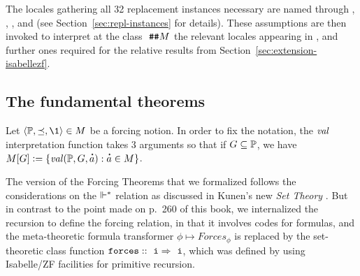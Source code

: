 The locales gathering all 32 replacement instances necessary are named
 through ,
,
, and
 (see
Section~\ref{sec:repl-instances} for details).
These assumptions are then invoked to interpret at the class
$\isatt{\#\#} M$ the relevant locales appearing in
, and further ones required for the relative
results from Section~\ref{sec:extension-isabellezf}.


\subsection{The fundamental theorems}
Let $\lb \PP, {\preceq} ,\1\rb \in M$ be a forcing notion. In order to
fix the notation, the
$\operatorname{\mathit{val}}$ interpretation function takes $3$ arguments so that if $G\subseteq \mathbb{P}$, we have
$M[G]\defi \{ \val(\PP,G,\punto{a}) : \punto{a}\in M \}$.

The version of the Forcing Theorems that we formalized follows the
considerations on the $\Vdash^*$ relation as discussed in Kunen's new
\emph{Set Theory}
\cite[p.~257ff]{kunen2011set}. But in contrast to the point made on
p.~260 of this book, we internalized the recursion to define the forcing relation,
in that it involves codes for formulas, and the meta-theoretic formula
transformer $\phi\mapsto\mathit{Forces}_\phi$ is replaced by the
set-theoretic class function $\forceisa:: \tyi \fun \tyi$, which was defined by using
Isabelle/ZF facilities for primitive recursion.

